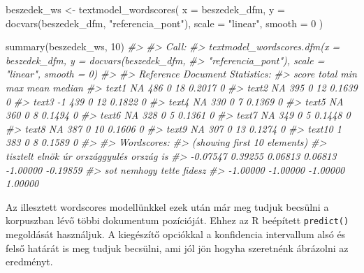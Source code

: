 \documentclass[
]{book}
\newenvironment{Shaded}{\begin{snugshade}}{\end{snugshade}}
\newcommand{\AttributeTok}[1]{\textcolor[rgb]{0.77,0.63,0.00}{#1}}
\newcommand{\CommentTok}[1]{\textcolor[rgb]{0.56,0.35,0.01}{\textit{#1}}}
\newcommand{\DecValTok}[1]{\textcolor[rgb]{0.00,0.00,0.81}{#1}}
\newcommand{\FunctionTok}[1]{\textcolor[rgb]{0.00,0.00,0.00}{#1}}
\newcommand{\NormalTok}[1]{#1}
\newcommand{\OtherTok}[1]{\textcolor[rgb]{0.56,0.35,0.01}{#1}}
\newcommand{\StringTok}[1]{\textcolor[rgb]{0.31,0.60,0.02}{#1}}
\begin{document}
\begin{Shaded}
\begin{Highlighting}[]
\NormalTok{beszedek\_ws }\OtherTok{\textless{}{-}} \FunctionTok{textmodel\_wordscores}\NormalTok{(}
  \AttributeTok{x =}\NormalTok{ beszedek\_dfm,}
  \AttributeTok{y =} \FunctionTok{docvars}\NormalTok{(beszedek\_dfm, }\StringTok{"referencia\_pont"}\NormalTok{),}
  \AttributeTok{scale =} \StringTok{"linear"}\NormalTok{,}
  \AttributeTok{smooth =} \DecValTok{0}
\NormalTok{  )}

\FunctionTok{summary}\NormalTok{(beszedek\_ws, }\DecValTok{10}\NormalTok{)}
\CommentTok{\#\textgreater{} }
\CommentTok{\#\textgreater{} Call:}
\CommentTok{\#\textgreater{} textmodel\_wordscores.dfm(x = beszedek\_dfm, y = docvars(beszedek\_dfm, }
\CommentTok{\#\textgreater{}     "referencia\_pont"), scale = "linear", smooth = 0)}
\CommentTok{\#\textgreater{} }
\CommentTok{\#\textgreater{} Reference Document Statistics:}
\CommentTok{\#\textgreater{}        score total min max   mean median}
\CommentTok{\#\textgreater{} text1     NA   486   0  18 0.2017      0}
\CommentTok{\#\textgreater{} text2     NA   395   0  12 0.1639      0}
\CommentTok{\#\textgreater{} text3     {-}1   439   0  12 0.1822      0}
\CommentTok{\#\textgreater{} text4     NA   330   0   7 0.1369      0}
\CommentTok{\#\textgreater{} text5     NA   360   0   8 0.1494      0}
\CommentTok{\#\textgreater{} text6     NA   328   0   5 0.1361      0}
\CommentTok{\#\textgreater{} text7     NA   349   0   5 0.1448      0}
\CommentTok{\#\textgreater{} text8     NA   387   0  10 0.1606      0}
\CommentTok{\#\textgreater{} text9     NA   307   0  13 0.1274      0}
\CommentTok{\#\textgreater{} text10     1   383   0   8 0.1589      0}
\CommentTok{\#\textgreater{} }
\CommentTok{\#\textgreater{} Wordscores:}
\CommentTok{\#\textgreater{} (showing first 10 elements)}
\CommentTok{\#\textgreater{}     tisztelt        elnök           úr országgyulés       ország           is }
\CommentTok{\#\textgreater{}     {-}0.07547      0.39255      0.06813      0.06813     {-}1.00000     {-}0.19859 }
\CommentTok{\#\textgreater{}          sot      nemhogy        tette       fidesz }
\CommentTok{\#\textgreater{}     {-}1.00000     {-}1.00000     {-}1.00000      1.00000}
\end{Highlighting}
\end{Shaded}

Az illesztett wordscores modellünkkel ezek után már meg tudjuk becsülni
a korpuszban lévő többi dokumentum pozícióját. Ehhez az R beépített
\texttt{predict()} megoldását használjuk. A kiegészítő opciókkal a
konfidencia intervallum alsó és felső határát is meg tudjuk becsülni,
ami jól jön hogyha szeretnénk ábrázolni az eredményt.
\end{document}
